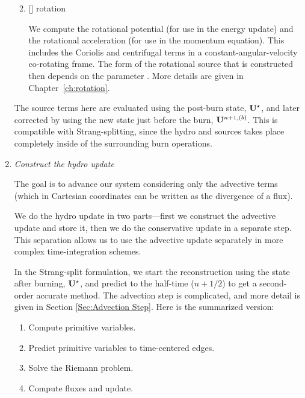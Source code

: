 \begin{enumerate}
\begin{enumerate}


  \item {[]} rotation

    We compute the rotational potential (for use in the energy update)
    and the rotational acceleration (for use in the momentum
    equation).  This includes the Coriolis and centrifugal terms in a
    constant-angular-velocity co-rotating frame.  The form of the
    rotational source that is constructed then depends on the
    parameter .  More details are
    given in Chapter~\ref{ch:rotation}.
    
\end{enumerate}

The source terms here are evaluated using the post-burn state,
${\bf U}^\star$, and later corrected by using the new state just before
the burn, ${\bf U}^{n+1,(b)}$.  This is compatible with Strang-splitting,
since the hydro and sources takes place completely inside of the
surrounding burn operations.

\item {\em Construct the hydro update}

The goal is to advance our system considering only the advective terms
(which in Cartesian coordinates can be written as the divergence of a
flux).  

We do the hydro update in two parts---first we construct the advective
update and store it, then we do the conservative update in a separate
step.  This separation allows us to use the advective update
separately in more complex time-integration schemes.

In the Strang-split formulation, we start the reconstruction using the
state after burning, ${\bf U}^\star$, and predict to the half-time
($n+1/2$) to get a second-order accurate method.  The advection step
is complicated, and more detail is given in Section \ref{Sec:Advection
  Step}.
Here is the summarized version:
\begin{enumerate}
\item Compute primitive variables.
\item Predict primitive variables to time-centered edges.
\item Solve the Riemann problem.
\item Compute fluxes and update.
\end{enumerate}


\end{enumerate}
